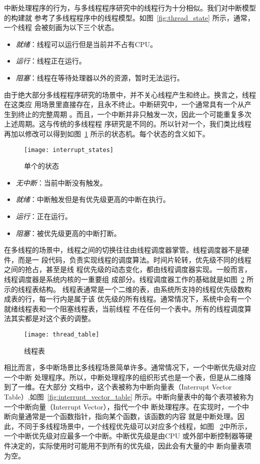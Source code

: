 中断处理程序的行为，与多线程程序研究中的线程行为十分相似。我们对中断模型的构建就
参考了多线程程序中的线程模型。如图~\ref{fig:thread_state} 所示，通常，一个线程
会被刻画为以下三个状态。
\begin{itemize}
	\item \emph{就绪}：线程可以运行但是当前并不占有CPU。
	\item \emph{运行}：线程正在运行。
	\item \emph{阻塞}：线程在等待处理器以外的资源，暂时无法运行。
\end{itemize}
由于绝大部分多线程程序研究的场景中，并不关心线程产生和终止。换言之，线程在这类应
用场景里直接存在，且永不终止。中断研究中，一个通常具有一个从产生到终止的完整周期
。而且，一个中断并非只触发一次，因此一个可能重复多次上述周期。这与传统的多线程程
序研究是不同的。所以针对一个，我们类比线程再加以修改可以得到如图~\ref{fig:interrupt_state} 
所示的状态机。每个状态的含义如下。

\begin{figure}[H]
	\centering
	\texttt{[image: interrupt\_states]}
	\caption{单个的状态}
	\label{fig:interrupt_state}
\end{figure}

\begin{itemize}
	\item \emph{无中断}：当前中断没有触发。
	\item \emph{就绪}：中断触发但是有优先级更高的中断在执行。
	\item \emph{运行}：正在运行。
	\item \emph{阻塞}：被优先级更高的中断打断。
\end{itemize}

在多线程的场景中，线程之间的切换往往由线程调度器掌管。线程调度器不是硬件，而是一
段代码，负责实现线程的调度算法。时间片轮转，优先级不同的线程之间的抢占，甚至是线
程优先级的动态变化，都由线程调度器实现。一般而言，线程调度器是系统内核的一重要组
成部分。线程调度器工作的基础就是如图~\ref{fig:thread_table} 所示的线程表结构。
线程表通常是一个二维的表，由系统所支持的线程优先级数构成表的行，每一行内是属于该
优先级的所有线程。通常情况下，系统中会有一个就绪线程表和一个阻塞线程表，当前线程
不在任何一个表中。所有的线程调度算法其实都是对这个表的调整。

\begin{figure}
	\centering
	\texttt{[image: thread\_table]}
	\caption{线程表}
	\label{fig:thread_table}
\end{figure}

相比而言，多中断场景比多线程场景简单许多。通常情况下，一个中断优先级对应一个中断
处理程序。所以，中断处理程序的组织形式也是一个表，但是从二维降到了一维。在大部分
文档中，这个表被称为中断向量表（Interrupt Vector Table）,如图~\ref{fig:interrupt_vector_table} 
所示。中断向量表中的每个表项被称为一个中断向量（Interrupt Vector），指代一个中
断处理程序。在实现时，一个中断向量通常是一个函数指针，指向某个函数，该函数的内容
就是中断处理。因此，不同于多线程场景中，一个线程优先级可以对应多个线程，如图~
\ref{fig:thread_table}中所示，一个中断优先级对应最多一个中断。中断优先级是由CPU
或外部中断控制器等硬件决定的，实际使用时可能用不到所有的优先级，因此会有大量的中
断向量表项为空。

